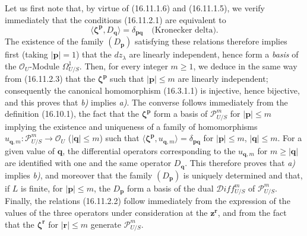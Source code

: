 Let us first note that, by virtue of (16.11.1.6) and (16.11.1.5), we verify
immediately that the conditions (16.11.2.1) are equivalent to
\[
  \langle\boldsymbol{\zeta}^{\mathbf{p}},D_{\mathbf{q}}\rangle
  =\delta_{\mathbf{p}\mathbf{q}}
  \quad\text{(Kronecker delta)}.
  \tag{16.11.2.3}
  \label{IV.16.11.2.3}
\]
The existence of the family $(D_{\mathbf{p}})$ satisfying these relations
therefore implies first (taking $|\mathbf{p}|=1$) that the $dz_\lambda$ are
linearly independent, hence form a \emph{basis} of the
$\mathcal{O}_U$-Module $\varOmega_{U/S}^1$. Then, for every integer $m\geq1$, we
deduce in the same way from (16.11.2.3) that the
$\boldsymbol{\zeta}^{\mathbf{p}}$ such that $|\mathbf{p}|\leq m$ are linearly
independent; consequently the canonical homomorphism (16.3.1.1) is injective,
hence bijective, and this proves that \emph{b)} implies \emph{a)}. The converse follows
immediately from the definition (16.10.1), the fact that the
$\boldsymbol{\zeta}^{\mathbf{p}}$ form a basis of $\mathscr{P}_{U/S}^m$ for
$|\mathbf{p}|\leq m$ implying the existence and uniqueness of a family of
homomorphisms $u_{\mathbf{q},m}:\mathscr{P}_{U/S}^m\to\mathcal{O}_U$
($|\mathbf{q}|\leq m$) such that
$\langle\boldsymbol{\zeta}^{\mathbf{p}},u_{\mathbf{q},m}\rangle
=\delta_{\mathbf{p}\mathbf{q}}$ for $|\mathbf{p}|\leq m$,
$|\mathbf{q}|\leq m$. For a given value of $\mathbf{q}$, the differential
operators corresponding to the $u_{\mathbf{q},m}$ for
$m\geq|\mathbf{q}|$ are identified with one and the same operator
$D_{\mathbf{q}}$. This therefore proves that \emph{a)} implies \emph{b)}, and moreover that
the family $(D_{\mathbf{p}})$ is uniquely determined and that, if $L$ is
finite, for $|\mathbf{p}|\leq m$, the $D_{\mathbf{p}}$ form a basis of the
dual $\mathscr{D}\!iff_{U/S}^m$ of $\mathscr{P}_{U/S}^m$. Finally, the
relations (16.11.2.2) follow immediately from the expression of the values of
the three operators under consideration at the $\mathbf{z}^{\mathbf{r}}$, and
from the fact that the $\boldsymbol{\zeta}^{\mathbf{r}}$ for
$|\mathbf{r}|\leq m$ generate $\mathscr{P}_{U/S}^m$.


